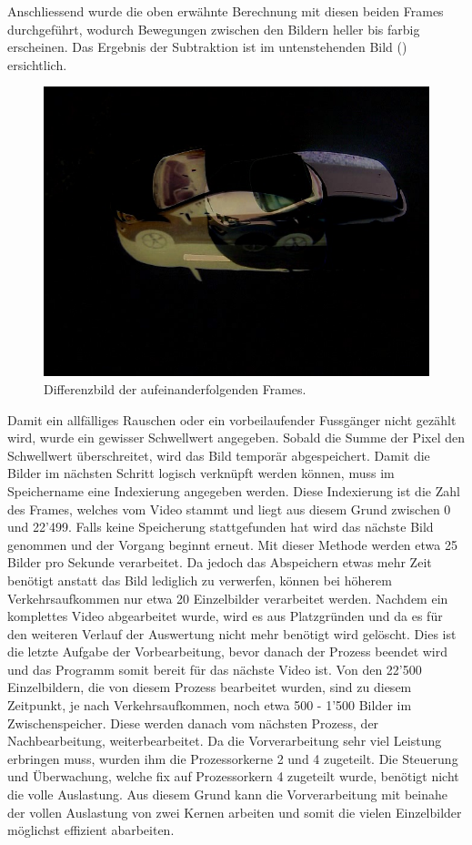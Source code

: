 Anschliessend wurde die oben erwähnte Berechnung mit diesen beiden Frames durchgeführt, wodurch Bewegungen zwischen den Bildern heller bis farbig erscheinen. Das Ergebnis der Subtraktion ist im untenstehenden Bild () ersichtlich.

\begin{figure}[H]
  \centering
  \includegraphics[height=0.3\textheight]{Software/Blur1.jpg} 
  \caption{Differenzbild der aufeinanderfolgenden Frames.}
  \label{bBlur1}
\end{figure} 

Damit ein allfälliges Rauschen oder ein vorbeilaufender Fussgänger nicht gezählt wird, wurde ein gewisser Schwellwert angegeben. Sobald die Summe der Pixel den Schwellwert überschreitet, wird das Bild temporär abgespeichert. Damit die Bilder im nächsten Schritt logisch verknüpft werden können, muss im Speichername eine Indexierung angegeben werden. Diese Indexierung ist die Zahl des Frames, welches vom Video stammt und liegt aus diesem Grund zwischen 0 und 22'499. Falls keine Speicherung stattgefunden hat wird das nächste Bild genommen und der Vorgang beginnt erneut. Mit dieser Methode werden etwa 25 Bilder pro Sekunde verarbeitet. Da jedoch das Abspeichern etwas mehr Zeit benötigt anstatt das Bild lediglich zu verwerfen, können bei höherem Verkehrsaufkommen nur etwa 20 Einzelbilder verarbeitet werden. Nachdem ein komplettes Video abgearbeitet wurde, wird es aus Platzgründen und da es für den weiteren Verlauf der Auswertung nicht mehr benötigt wird gelöscht. Dies ist die letzte Aufgabe der Vorbearbeitung, bevor danach der Prozess beendet wird und das Programm somit bereit für das nächste Video ist. Von den 22'500 Einzelbildern, die von diesem Prozess bearbeitet wurden, sind zu diesem Zeitpunkt, je nach Verkehrsaufkommen, noch etwa 500 - 1'500 Bilder im Zwischenspeicher. Diese werden danach vom nächsten Prozess, der Nachbearbeitung, weiterbearbeitet. Da die Vorverarbeitung sehr viel Leistung erbringen muss, wurden ihm die Prozessorkerne 2 und 4 zugeteilt. Die Steuerung und Überwachung, welche fix auf Prozessorkern 4 zugeteilt wurde, benötigt nicht die volle Auslastung. Aus diesem Grund kann die Vorverarbeitung mit beinahe der vollen Auslastung von zwei Kernen arbeiten und somit die vielen Einzelbilder möglichst effizient abarbeiten.


